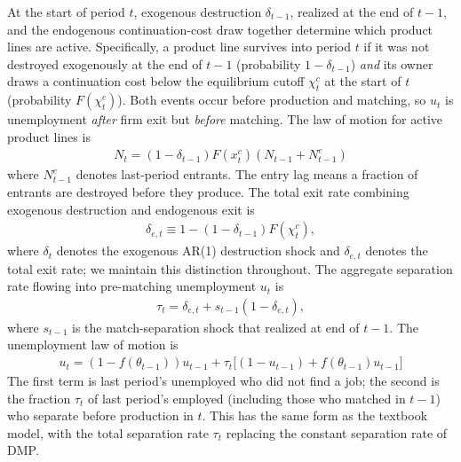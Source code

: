 \documentclass[authoryear, review, 12pt]{elsarticle}
\begin{document}
	At the start of period $t$, exogenous destruction $\delta_{t-1}$, realized at the end of $t-1$, and the endogenous continuation-cost draw together determine which product lines are active. Specifically, a product line survives into period $t$ if it was not destroyed exogenously at the end of $t-1$ (probability 
	$1-\delta_{t-1}$) \emph{and} its owner draws a continuation cost below the equilibrium cutoff $\chi_t^c$ at the start of $t$ 
	(probability $F(\chi_t^c)$). Both events occur before production and 
	matching, so $u_t$ is unemployment \emph{after} firm exit but 
	\emph{before} matching. The law of motion for active product lines 
	is
	\begin{align}
		N_{t}=(1-\delta_{t-1})F(x_{t}^c)(N_{t-1}+N_{t-1}^e) 
		\label{eq:firm_law_motion}
	\end{align}
	where $N_{t-1}^e$ denotes last-period entrants. The entry lag 
	means a fraction of entrants are destroyed before they produce. 
	The total exit rate combining exogenous destruction and endogenous 
	exit is
	\begin{align}
		\delta_{e,t}\equiv 1-(1-\delta_{t-1})F(\chi_t^c), 
		\label{eq:delta_e_lom}
	\end{align}
	where $\delta_t$ denotes the exogenous AR(1) destruction shock 
	and $\delta_{e,t}$ denotes the total exit rate; we maintain this 
	distinction throughout. The aggregate separation rate flowing into 
	pre-matching unemployment $u_t$ is
	\begin{align}
		\tau_{t} = \delta_{e,t} + s_{t-1}(1-\delta_{e,t}), 
		\label{eq:tau_lom}
	\end{align}
	where $s_{t-1}$ is the match-separation shock that realized at 
	end of $t-1$. The unemployment law of motion is
	\begin{align}
		u_{t}=(1-f(\theta_{t-1}))u_{t-1}+\tau_{t}
		\bigl[(1-u_{t-1})+f(\theta_{t-1})u_{t-1}\bigr]\label{eq:u_lom}
	\end{align}
	The first term is last period's unemployed who did not find a 
	job; the second is the fraction $\tau_t$ of last period's 
	employed (including those who matched in $t-1$) who separate 
	before production in $t$. This has the same form as the textbook 
	model, with the total separation rate $\tau_t$ replacing the 
	constant separation rate of DMP.
	
\end{document}
